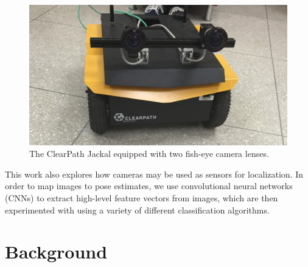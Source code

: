 \documentclass[letterpaper, 10 pt, conference]{ieeeconf}  %
\begin{document}
\begin{figure}[h]
\centering
\includegraphics[scale=0.09]{jackal}
\caption{The ClearPath Jackal equipped with two fish-eye camera lenses.}
\end{figure}

\par 
This work also explores how cameras may be used as sensors for localization. In order to map images to pose estimates, we use convolutional neural networks (CNNs) to extract high-level feature vectors from images, which are then experimented with using a variety of different classification algorithms. 

\section{Background}
\end{document}
